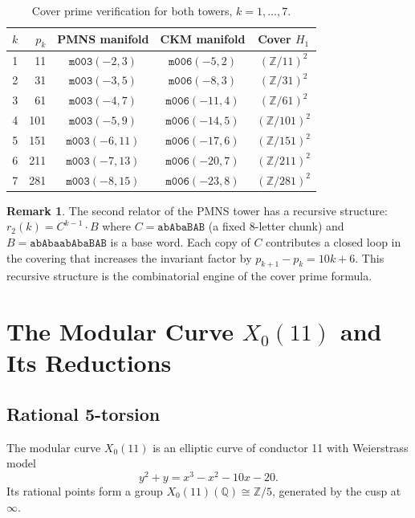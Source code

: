 \documentclass[11pt,a4paper]{article}
\theoremstyle{definition}
\newtheorem{remark}[theorem]{Remark}
\newcommand{\ZZ}{\mathbb{Z}}
\newcommand{\QQ}{\mathbb{Q}}
\newcommand{\pk}{p_k}
\newcommand{\Xo}{X_0(11)}
\begin{document}
\begin{table}[h]
\centering
\caption{Cover prime verification for both towers, $k=1,\ldots,7$.}
\label{tab:cover}
\begin{tabular}{rrccc}
\toprule
$k$ & $\pk$ & PMNS manifold & CKM manifold & Cover $H_1$ \\
\midrule
1 & 11  & $\texttt{m003}(-2,3)$  & $\texttt{m006}(-5,2)$  & $(\ZZ/11)^2$  \\
2 & 31  & $\texttt{m003}(-3,5)$  & $\texttt{m006}(-8,3)$  & $(\ZZ/31)^2$  \\
3 & 61  & $\texttt{m003}(-4,7)$  & $\texttt{m006}(-11,4)$ & $(\ZZ/61)^2$  \\
4 & 101 & $\texttt{m003}(-5,9)$  & $\texttt{m006}(-14,5)$ & $(\ZZ/101)^2$ \\
5 & 151 & $\texttt{m003}(-6,11)$ & $\texttt{m006}(-17,6)$ & $(\ZZ/151)^2$ \\
6 & 211 & $\texttt{m003}(-7,13)$ & $\texttt{m006}(-20,7)$ & $(\ZZ/211)^2$ \\
7 & 281 & $\texttt{m003}(-8,15)$ & $\texttt{m006}(-23,8)$ & $(\ZZ/281)^2$ \\
\bottomrule
\end{tabular}
\end{table}

\begin{remark}
The second relator of the PMNS tower has a recursive structure:
$r_2(k) = C^{k-1} \cdot B$ where
$C = \texttt{abAbaBAB}$ (a fixed 8-letter chunk) and
$B = \texttt{abAbaabAbaBAB}$ is a base word.
Each copy of $C$ contributes a closed loop in the covering
that increases the invariant factor by $p_{k+1} - p_k = 10k+6$.
This recursive structure is the combinatorial engine of
the cover prime formula.
\end{remark}

\section{The Modular Curve $X_0(11)$ and Its Reductions}
\label{sec:x011}

\subsection{Rational 5-torsion}

The modular curve $\Xo$ is an elliptic curve of conductor 11
with Weierstrass model
\[
  y^2 + y = x^3 - x^2 - 10x - 20.
\]
Its rational points form a group $\Xo(\QQ) \cong \ZZ/5$,
generated by the cusp at $\infty$.
\end{document}
